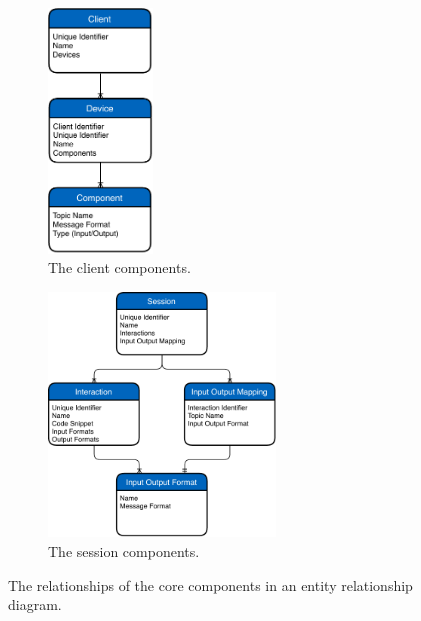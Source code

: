 \begin{figure}[H]
	\centering
	\begin{subfigure}{.5\textwidth}
		\centering
		\includegraphics[height=6.5cm]{figures/implementation/ubii_er_client.pdf}
		\caption{The client components.}\label{fig:ubii-er-client}
	\end{subfigure}%
	\begin{subfigure}{.5\textwidth}
		\centering
		\includegraphics[height=6.5cm]{figures/implementation/ubii_er_server.pdf}
		\caption{The session components.}\label{fig:ubii-er-server}
	\end{subfigure} %
	\caption[UBII components diagram]{The relationships of the core components in an entity relationship diagram.}\label{fig:ubii-er}
\end{figure}

